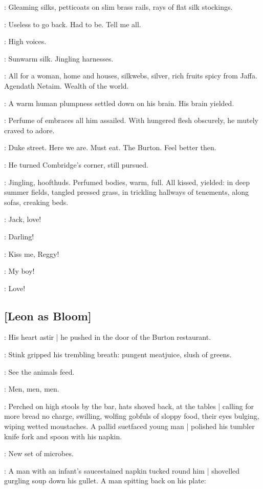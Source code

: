 :
Gleaming silks,
petticoats on slim brass rails,
rays of flat silk stockings.

\BloomInt:
Useless to go back.
Had to be.
Tell me all.

\BloomInt:
High voices.

:
Sunwarm silk.
Jingling harnesses.

\BloomInt:
All for a woman,
home and houses,
silkwebs, silver,
rich fruits spicy from Jaffa.
Agendath Netaim.
Wealth of the world.

:
A warm human plumpness settled down on his brain.
His brain yielded.

:
Perfume of embraces all him assailed.
With hungered flesh obscurely,
he mutely craved to adore.

\BloomInt:
Duke street.
Here we are.
Must eat.
The Burton.
Feel better then.

:
He turned Combridge's corner, still pursued.

:
Jingling, hoofthuds.
Perfumed bodies, warm, full.
All kissed, yielded:
in deep summer fields,
tangled pressed grass,
in trickling hallways of tenements,
along sofas, creaking beds.

:
Jack,
love!

:
Darling!

:
Kiss me,
Reggy!

:
My boy!

:
Love!

\subsection{[Leon as Bloom]}

:
His heart astir |
he pushed in the door of the Burton restaurant.

:
Stink gripped his trembling breath:
pungent meatjuice, slush of greens.

\BloomInt:
See the animals feed.

\BloomInt:
Men, men, men.

:
Perched on high stools by the bar,
hats shoved back,
at the tables |
calling for more bread no charge,
swilling,
wolfing gobfuls of sloppy food,
their eyes bulging,
wiping wetted moustaches.
A pallid suetfaced young man |
polished his tumbler knife fork and spoon with his napkin.

\BloomInt:
New set of microbes.

:
A man with an infant's saucestained napkin tucked round him |
shovelled gurgling soup down his gullet.
A man spitting back on his plate:

